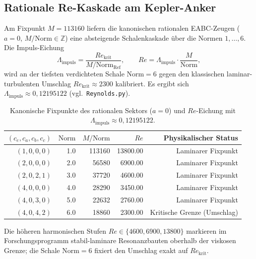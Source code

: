 \subsection{Rationale Re-Kaskade am Kepler-Anker}\label{sec:eabc-zeugen-rational}

Am Fixpunkt $M=113160$ liefern die kanonischen rationalen EABC-Zeugen ($a=0$, $M/\mathrm{Norm}\in\mathbb{Z}$) eine absteigende Schalenkaskade über die Normen $1,\ldots,6$. Die Impuls-Eichung
\[
  \Lambda_{\mathrm{impuls}} = \frac{Re_{\mathrm{krit}}}{M/\mathrm{Norm}_{\mathrm{Ref}}},
  \qquad
  Re = \Lambda_{\mathrm{impuls}}\cdot\frac{M}{\mathrm{Norm}},
\]
wird an der tiefsten verdichteten Schale $\mathrm{Norm}=6$ gegen den klassischen laminar-turbulenten Umschlag $Re_{\mathrm{krit}}\approx 2300$ kalibriert. Es ergibt sich $\Lambda_{\mathrm{impuls}}\approx 0{,}12195122$ (vgl.\ \texttt{Reynolds.py}).

\begin{table}[ht]
  \centering
  \caption{Kanonische Fixpunkte des rationalen Sektors ($a=0$) und $Re$-Eichung mit $\Lambda_{\mathrm{impuls}}\approx 0{,}12195122$.}
  \label{tab:eabc-rational}
  \begin{tabular}{rrrrr}
    \toprule
    $(c_e,c_a,c_b,c_c)$ & $\mathrm{Norm}$ & $M/\mathrm{Norm}$ & $Re$ & Physikalischer Status \\
    \midrule
    $(1, 0, 0, 0)$ & 1.0 & 113160 & 13800.00 & Laminarer Fixpunkt \\
    $(2, 0, 0, 0)$ & 2.0 & 56580 & 6900.00 & Laminarer Fixpunkt \\
    $(2, 0, 2, 1)$ & 3.0 & 37720 & 4600.00 & Laminarer Fixpunkt \\
    $(4, 0, 0, 0)$ & 4.0 & 28290 & 3450.00 & Laminarer Fixpunkt \\
    $(4, 0, 3, 0)$ & 5.0 & 22632 & 2760.00 & Laminarer Fixpunkt \\
    $(4, 0, 4, 2)$ & 6.0 & 18860 & 2300.00 & Kritische Grenze (Umschlag) \\
    \bottomrule
  \end{tabular}
\end{table}

Die höheren harmonischen Stufen $Re\in\{4600,6900,13800\}$ markieren im Forschungsprogramm stabil-laminare Resonanzbauten oberhalb der viskosen Grenze; die Schale $\mathrm{Norm}=6$ fixiert den Umschlag exakt auf $Re_{\mathrm{krit}}$.
